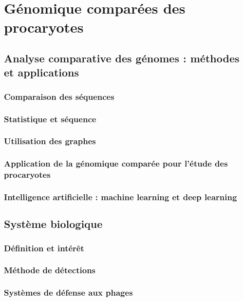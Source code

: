 \chapter{Génomique comparées des procaryotes}
\section{Analyse comparative des génomes : méthodes et applications}
\label{sec:comp_gen}
\subsection{Comparaison des séquences}
\subsection{Statistique et séquence}
\subsection{Utilisation des graphes}
\subsection{Application de la génomique comparée pour l'étude des procaryotes}
\subsection{Intelligence artificielle : machine learning et deep learning}
\section{Système biologique}
\subsection{Définition et intérêt}
\subsection{Méthode de détections}
\subsection{Systèmes de défense aux phages}